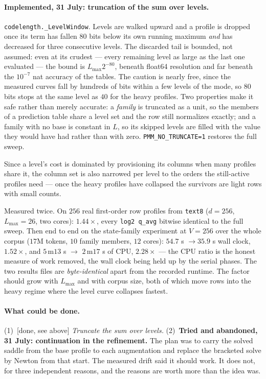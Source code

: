 \documentclass[11pt]{article}
\newcommand{\field}[1]{\paragraph{#1.}}
\begin{document}
\field{Implemented, 31 July: truncation of the sum over levels}
\texttt{codelength.\_LevelWindow}.  Levels are walked upward and a
profile is dropped once its term has fallen $80$ bits below its own
running maximum \emph{and} has decreased for three consecutive levels.
The discarded tail is bounded, not assumed: even at its crudest ---
every remaining level as large as the last one evaluated --- the bound
is $L_{\max}2^{-80}$, beneath float64 resolution and far beneath the
$10^{-7}$ nat accuracy of the tables.  The caution is nearly free,
since the measured curves fall by hundreds of bits within a few levels
of the mode, so $80$ bits stops at the same level as $40$ for the
heavy profiles.  Two properties make it safe rather than merely
accurate: a \emph{family} is truncated as a unit, so the members of a
prediction table share a level set and the row still normalizes
exactly; and a family with no base is constant in $L$, so its skipped
levels are filled with the value they would have had rather than with
zero.  \texttt{PMM\_NO\_TRUNCATE=1} restores the full sweep.

Since a level's cost is dominated by provisioning its columns when
many profiles share it, the column set is also narrowed per level to
the orders the still-active profiles need --- once the heavy profiles
have collapsed the survivors are light rows with small counts.

Measured twice.  On $256$ real first-order row profiles from
\texttt{text8} ($d = 256$, $L_{\max} = 26$, two cores): $1.44\times$,
every \texttt{log2 q\_avg} bitwise identical to the full sweep.  Then
end to end on the state-family experiment at $V = 256$ over the whole
corpus ($17$M tokens, $10$ family members, $12$ cores): $54.7$ s
$\to 35.9$ s wall clock, $1.52\times$, and $5$\,m$13$ s $\to$
$2$\,m$17$ s of CPU, $2.28\times$ --- the CPU ratio is the honest
measure of work removed, the wall clock being held up by the serial
phases.  The two results files are \emph{byte-identical} apart from
the recorded runtime.  The factor should grow with $L_{\max}$ and with
corpus size, both of which move rows into the heavy regime where the
level curve collapses fastest.

\field{What could be done}
(1)~[done, see above] \emph{Truncate the sum over levels.}
(2)~\textbf{Tried and abandoned, 31 July: continuation in the
refinement.}  The plan was to carry the solved saddle from the base
profile to each augmentation and replace the bracketed solve by Newton
from that start.  The measured drift said it should work.  It does
not, for three independent reasons, and the reasons are worth more
than the idea was.
\end{document}
